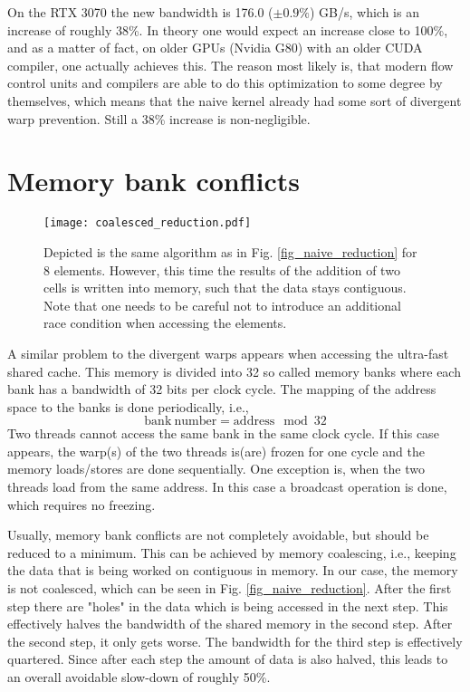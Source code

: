 On the RTX 3070 the new bandwidth is 176.0 (\( \pm 0.9\% \)) GB/s, which is an increase of roughly 38\%.
In theory one would expect an increase close to 100\%, and as a matter of fact, on older GPUs (Nvidia G80) with an older CUDA compiler, one actually achieves this.
The reason most likely is, that modern flow control units and compilers are able to do this optimization to some degree by themselves, which means that the naive kernel already had some sort of divergent warp prevention.
Still a 38\% increase is non-negligible.

\section{Memory bank conflicts}

\begin{figure}
    \centering
    \texttt{[image: coalesced\_reduction.pdf]}
    \caption{
        Depicted is the same algorithm as in Fig. \ref{fig_naive_reduction} for 8 elements.
        However, this time the results of the addition of two cells is written into memory, such that the data stays contiguous.
        Note that one needs to be careful not to introduce an additional race condition when accessing the elements.
    } \label{fig_coalesced_reduction}
\end{figure}

A similar problem to the divergent warps appears when accessing the ultra-fast shared cache.
This memory is divided into 32 so called memory banks where each bank has a bandwidth of 32 bits per clock cycle.
The mapping of the address space to the banks is done periodically, i.e., 
\begin{equation}
\mathrm{bank\ number} = \mathrm{address} \mod 32
\end{equation}
Two threads cannot access the same bank in the same clock cycle.
If this case appears, the warp(s) of the two threads is(are) frozen for one cycle and the memory loads/stores are done sequentially.
One exception is, when the two threads load from the same address.
In this case a broadcast operation is done, which requires no freezing.

Usually, memory bank conflicts are not completely avoidable, but should be reduced to a minimum.
This can be achieved by memory coalescing, i.e., keeping the data that is being worked on contiguous in memory.
In our case, the memory is not coalesced, which can be seen in Fig. \ref{fig_naive_reduction}.
After the first step there are "holes" in the data which is being accessed in the next step.
This effectively halves the bandwidth of the shared memory in the second step.
After the second step, it only gets worse.
The bandwidth for the third step is effectively quartered.
Since after each step the amount of data is also halved, this leads to an overall avoidable slow-down of roughly 50\%.

